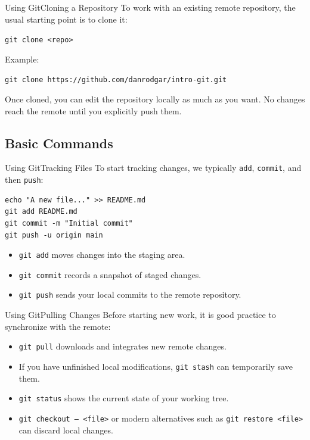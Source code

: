 \documentclass[10pt,compress]{beamer}
\begin{document}
\begin{frame}{Using Git}{Cloning a Repository}
To work with an existing remote repository, the usual starting point is to clone it:

\bigskip

\texttt{git clone <repo>}

\bigskip

Example:

\texttt{git clone https://github.com/danrodgar/intro-git.git}

\bigskip

Once cloned, you can edit the repository locally as much as you want.
No changes reach the remote until you explicitly push them.
\end{frame}

\subsection{Basic Commands}

\begin{frame}[fragile]{Using Git}{Tracking Files}
To start tracking changes, we typically \texttt{add}, \texttt{commit}, and then \texttt{push}:

\begin{verbatim}
echo "A new file..." >> README.md
git add README.md
git commit -m "Initial commit"
git push -u origin main
\end{verbatim}

\begin{itemize}
 \item \texttt{git add} moves changes into the staging area.
 \item \texttt{git commit} records a snapshot of staged changes.
 \item \texttt{git push} sends your local commits to the remote repository.
\end{itemize}
\end{frame}

\begin{frame}{Using Git}{Pulling Changes}
Before starting new work, it is good practice to synchronize with the remote:

\begin{itemize}
 \item \texttt{git pull} downloads and integrates new remote changes.
 \item If you have unfinished local modifications, \texttt{git stash} can temporarily save them.
 \item \texttt{git status} shows the current state of your working tree.
 \item \texttt{git checkout -- <file>} or modern alternatives such as \texttt{git restore <file>} can discard local changes.
\end{itemize}
\end{frame}
\end{document}
